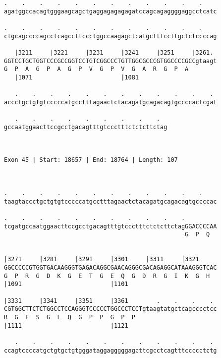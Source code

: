 \documentclass{article}
\begin{document}
\begin{Verbatim}
.    .    .    .    .    .    .    .    .    .    .    .    
agatggccacagtgggaagcagctgaggagagagagatccagcagaggggaggcctcatc
                                                            
.    .    .    .    .    .    .    .    .    .    .    .    
ctgcagccccagcctcagccttccctggccaagagctcatgctttccttgctctccccag
                                                            
   |3211     |3221     |3231     |3241     |3251     |3261. 
GGTCCTGCTGGTCCCGCCGGTCCTGTCGGCCCTGTTGGCGCCCGTGGCCCCGCCgtaagt
G  P  A  G  P  A  G  P  V  G  P  V  G  A  R  G  P  A        
   |1071                         |1081                      
  
   .    .    .    .    .    .    .    .    .    .    .    . 
accctgctgtgtcccccatgcctttagaactctacagatgcagacagtgccccactcgat
                                                            
   .    .    .    .    .    .    .    .    .  
gccaatggaacttccgcctgacagtttgtccctttctctcttctag
                                              
                                              
 
Exon 45 | Start: 18657 | End: 18764 | Length: 107



.    .    .    .    .    .    .    .    .    .    .    .    
taagtaccctgctgtgtcccccatgcctttagaactctacagatgcagacagtgccccac
                                                            
.    .    .    .    .    .    .    .    .    .    .         
tcgatgccaatggaacttccgcctgacagtttgtccctttctctcttctagGGACCCCAA
                                                   G  P  Q  
                                                            
  
|3271     |3281     |3291     |3301     |3311     |3321     
GGCCCCCGTGGTGACAAGGGTGAGACAGGCGAACAGGGCGACAGAGGCATAAAGGGTCAC
G  P  R  G  D  K  G  E  T  G  E  Q  G  D  R  G  I  K  G  H  
|1091                         |1101                         
  
|3331     |3341     |3351     |3361        .    .    .    . 
CGTGGCTTCTCTGGCCTCCAGGGTCCCCCTGGCCCTCCTgtaagtatgctcagcccctcc
R  G  F  S  G  L  Q  G  P  P  G  P  P                       
|1111                         |1121                         
  
   .    .    .    .    .    .    .    .    .    .    .    . 
ccagtccccatgctgtgctgtgggataggagggggagcttcgcctcagtttccccctctg
                                                            

\end{Verbatim}
\end{document}
